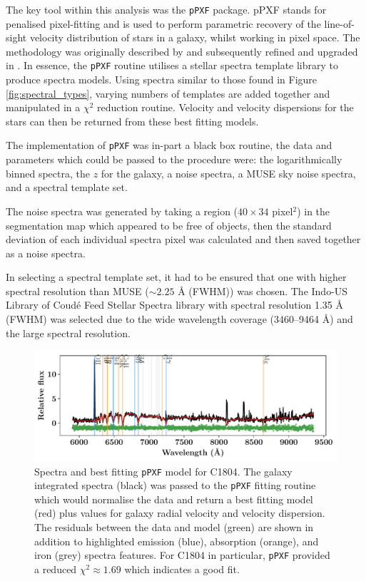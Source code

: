 \documentclass[12pt, twocolumn, nofootinbib]{revtex4-1}    %
\begin{document}
The key tool within this analysis was the \texttt{pPXF} package. pPXF stands for penalised pixel-fitting and is used to perform parametric recovery of the line-of-sight velocity distribution of stars in a galaxy, whilst working in pixel space. The methodology was originally described by \cite{2004PASP..116..138C} and subsequently refined and upgraded in \cite{2017MNRAS.466..798C}. In essence, the \texttt{pPXF} routine utilises a stellar spectra template library to produce spectra models. Using spectra similar to those found in Figure \ref{fig:spectral_types}, varying numbers of templates are added together and manipulated in a $\chi^2$ reduction routine. Velocity and velocity dispersions for the stars can then be returned from these best fitting models.

The implementation of \texttt{pPXF} was in-part a black box routine, the data and parameters which could be passed to the procedure were: the logarithmically binned spectra, the $z$ for the galaxy, a noise spectra, a MUSE sky noise spectra, and a spectral template set. 

The noise spectra was generated by taking a region ($40\times 34$ pixel$^2$) in the segmentation map which appeared to be free of objects, then the standard deviation of each individual spectra pixel was calculated and then saved together as a noise spectra. 

In selecting a spectral template set, it had to be ensured that one with higher spectral resolution than MUSE ($\sim2.25$ {\AA} (FWHM)) was chosen. The Indo-US Library of Coud{\'e} Feed Stellar Spectra \citep{2004ApJS..152..251V} library with spectral resolution 1.35 {\AA} (FWHM) was selected due to the wide wavelength coverage (3460--9464 {\AA}) and the large spectral resolution. 

\begin{figure}
\includegraphics[width=\textwidth]{data/cube_1804_spectra_complete}
\caption{Spectra and best fitting \texttt{pPXF} model for C1804. The galaxy integrated spectra (black) was passed to the \texttt{pPXF} fitting routine which would normalise the data and return a best fitting model (red) plus values for galaxy radial velocity and velocity dispersion. The residuals between the data and model (green) are shown in addition to highlighted emission (blue), absorption (orange), and iron (grey) spectra features. For C1804 in particular, \texttt{pPXF} provided a reduced $\chi^2 \approx 1.69$ which indicates a good fit.}
\label{fig:ppxf_spectra}
\end{figure}
\end{document}
